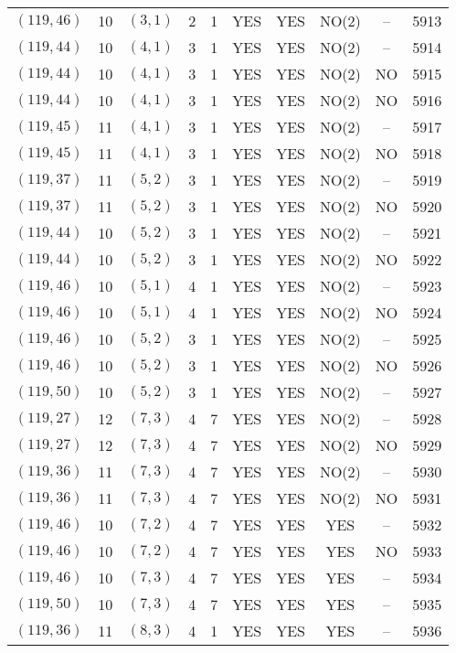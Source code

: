\begin{longtable}{|c|c|c|c|c|c|c|c|c|c|}
$(119, 46)$ & 10 & $(3, 1)$ & 2 & 1 & YES & YES & NO(2) & -- & 5913\\
$(119, 44)$ & 10 & $(4, 1)$ & 3 & 1 & YES & YES & NO(2) & -- & 5914\\
$(119, 44)$ & 10 & $(4, 1)$ & 3 & 1 & YES & YES & NO(2) & NO & 5915\\
$(119, 44)$ & 10 & $(4, 1)$ & 3 & 1 & YES & YES & NO(2) & NO & 5916\\
$(119, 45)$ & 11 & $(4, 1)$ & 3 & 1 & YES & YES & NO(2) & -- & 5917\\
$(119, 45)$ & 11 & $(4, 1)$ & 3 & 1 & YES & YES & NO(2) & NO & 5918\\
$(119, 37)$ & 11 & $(5, 2)$ & 3 & 1 & YES & YES & NO(2) & -- & 5919\\
$(119, 37)$ & 11 & $(5, 2)$ & 3 & 1 & YES & YES & NO(2) & NO & 5920\\
$(119, 44)$ & 10 & $(5, 2)$ & 3 & 1 & YES & YES & NO(2) & -- & 5921\\
$(119, 44)$ & 10 & $(5, 2)$ & 3 & 1 & YES & YES & NO(2) & NO & 5922\\
$(119, 46)$ & 10 & $(5, 1)$ & 4 & 1 & YES & YES & NO(2) & -- & 5923\\
$(119, 46)$ & 10 & $(5, 1)$ & 4 & 1 & YES & YES & NO(2) & NO & 5924\\
$(119, 46)$ & 10 & $(5, 2)$ & 3 & 1 & YES & YES & NO(2) & -- & 5925\\
$(119, 46)$ & 10 & $(5, 2)$ & 3 & 1 & YES & YES & NO(2) & NO & 5926\\
$(119, 50)$ & 10 & $(5, 2)$ & 3 & 1 & YES & YES & NO(2) & -- & 5927\\
$(119, 27)$ & 12 & $(7, 3)$ & 4 & 7 & YES & YES & NO(2) & -- & 5928\\
$(119, 27)$ & 12 & $(7, 3)$ & 4 & 7 & YES & YES & NO(2) & NO & 5929\\
$(119, 36)$ & 11 & $(7, 3)$ & 4 & 7 & YES & YES & NO(2) & -- & 5930\\
$(119, 36)$ & 11 & $(7, 3)$ & 4 & 7 & YES & YES & NO(2) & NO & 5931\\
$(119, 46)$ & 10 & $(7, 2)$ & 4 & 7 & YES & YES & YES & -- & 5932\\
$(119, 46)$ & 10 & $(7, 2)$ & 4 & 7 & YES & YES & YES & NO & 5933\\
$(119, 46)$ & 10 & $(7, 3)$ & 4 & 7 & YES & YES & YES & -- & 5934\\
$(119, 50)$ & 10 & $(7, 3)$ & 4 & 7 & YES & YES & YES & -- & 5935\\
$(119, 36)$ & 11 & $(8, 3)$ & 4 & 1 & YES & YES & YES & -- & 5936\\

\end{longtable}
